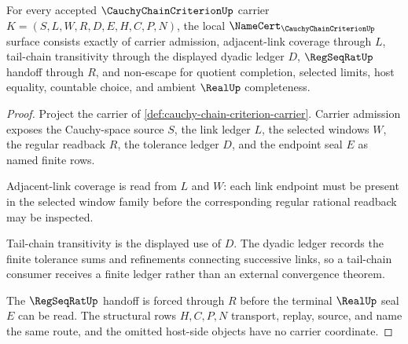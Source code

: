\begin{theorem}
\label{thm:cauchy-chain-criterion-namecert-obligations}
For every accepted $\CauchyChainCriterionUp$ carrier $K=(S,L,W,R,D,E,H,C,P,N)$, the local $\NameCert_{\CauchyChainCriterionUp}$ surface consists exactly of carrier admission, adjacent-link coverage through $L$, tail-chain transitivity through the displayed dyadic ledger $D$, $\RegSeqRatUp$ handoff through $R$, and non-escape for quotient completion, selected limits, host equality, countable choice, and ambient $\RealUp$ completeness.
\end{theorem}
\begin{proof}
Project the carrier of \autoref{def:cauchy-chain-criterion-carrier}. Carrier admission exposes the Cauchy-space source $S$, the link ledger $L$, the selected windows $W$, the regular readback $R$, the tolerance ledger $D$, and the endpoint seal $E$ as named finite rows.

Adjacent-link coverage is read from $L$ and $W$: each link endpoint must be present in the selected window family before the corresponding regular rational readback may be inspected.

Tail-chain transitivity is the displayed use of $D$. The dyadic ledger records the finite tolerance sums and refinements connecting successive links, so a tail-chain consumer receives a finite ledger rather than an external convergence theorem.

The $\RegSeqRatUp$ handoff is forced through $R$ before the terminal $\RealUp$ seal $E$ can be read. The structural rows $H,C,P,N$ transport, replay, source, and name the same route, and the omitted host-side objects have no carrier coordinate.
\end{proof}


\begin{closurestatus}{\CauchyChainCriterionUp}
  \theoryclosure{\seedClosure}
  \formalstatus{\unformalizedV}
\end{closurestatus}
